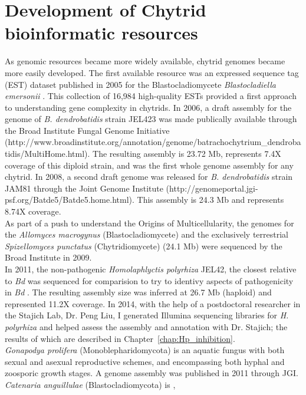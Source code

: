 \section{Development of Chytrid bioinformatic resources}
As genomic resources became more widely available, chytrid genomes became more easily developed. The first available resource was an expressed sequence tag (EST) dataset published in 2005 for the Blastocladiomycete \textit{Blastocladiella emersonii} \cite{Ribichich2005}. This collection of 16,984 high-quality ESTs provided a first approach to understanding gene complexity in chytrids. In 2006, a draft assembly for the genome of \textit{B. dendrobatidis} strain JEL423 was made publically available through the Broad Institute Fungal Genome Initiative (http://www.broadinstitute.org/annotation/genome/batrachochytrium\_dendrobatidis/MultiHome.html). The resulting assembly is 23.72 Mb, represents 7.4X coverage of this diploid strain, and was the first whole genome assembly for any chytrid. In 2008, a second draft genome was released for \textit{B. dendrobatidis} strain JAM81 through the Joint Genome Institute (http://genomeportal.jgi-psf.org/Batde5/Batde5.home.html). This assembly is 24.3 Mb and represents 8.74X coverage. \\
\indent As part of a push to understand the Origins of Multicellularity, the genomes for the \textit{Allomyces macrogynus} (Blastocladiomycete) and the exclusively terrestrial \textit{Spizellomyces punctatus} (Chytridiomycete) (24.1 Mb) were sequenced by the Broad Institute in 2009. \\
\indent In 2011, the non-pathogenic \textit{Homolaphlyctis polyrhiza} JEL42, the closest relative to \textit{Bd} was sequenced for comparision to try to identivy aspects of pathogenicity in \textit{Bd} \cite{Joneson2011}. The resulting assembly size was inferred at 26.7 Mb (haploid) and represented 11.2X coverage. In 2014, with the help of a postdoctoral researcher in the Stajich Lab, Dr. Peng Liu, I generated Illumina sequencing libraries for \textit{H. polyrhiza} and helped assess the assembly and annotation with Dr. Stajich; the results of which are described in Chapter~\ref{chap:Hp_inhibition}.\\
\indent \textit{Gonapodya prolifera} (Monoblepharidomycota) is an aquatic fungus with both sexual and asexual reproductive schemes, and encompassing both hyphal and zoosporic growth stages. A genome assembly was published in 2011 through JGI. \textit{Catenaria anguillulae} (Blastocladiomycota) is , \\
